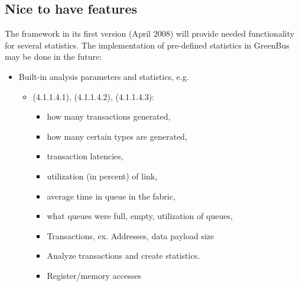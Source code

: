\subsection{Nice to have features}

The \GreenAV framework in its first version (April 2008) will provide needed functionality for several statistics. The implementation of pre-defined statistics in GreenBus may be done in the future:

\begin{itemize}
  \item Built-in analysis parameters and statistics, e.g.
  \begin{itemize}
    \item (4.1.1.4.1), (4.1.1.4.2), (4.1.1.4.3):
    \begin{itemize}
      \item how many transactions generated,
      \item how many certain types are generated,
      \item transaction latencies,
      \item utilization (in percent) of link,
      \item average time in queue in the fabric,
      \item what queues were full, empty, utilization of queues,
      \item Transactions, ex. Addresses, data payload size
      \item Analyze transactions and create statistics.
      \item Register/memory accesses
    \end{itemize}
  \end{itemize}
\end{itemize}